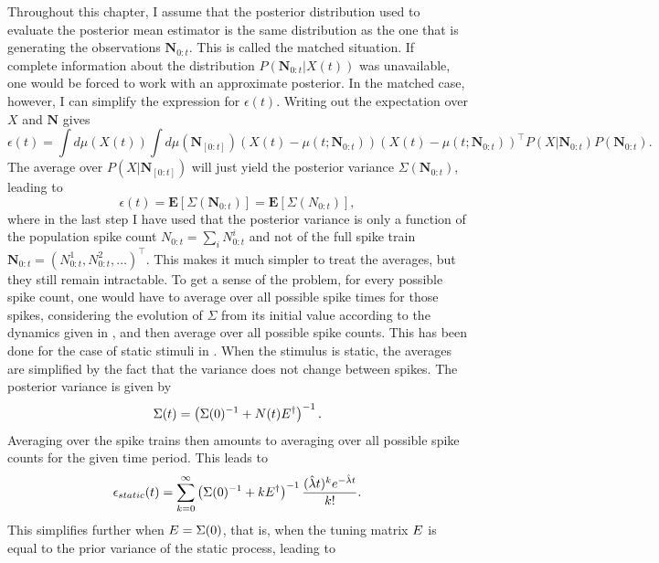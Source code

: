 Throughout this chapter, I assume that the posterior distribution used to evaluate the posterior mean estimator is the same distribution as the one that is generating the observations
$\boldsymbol{N}_{0:t}$. This is called the matched situation. If complete information about the distribution $P(\boldsymbol{N}_{0:t}|X(t))$ was unavailable, one would be forced to work
with an approximate posterior. In the matched case, however, I can simplify the expression for $\epsilon(t)$. Writing out the expectation over $X$ and $\boldsymbol{N}$ gives
\[
\epsilon(t) = \int d\mu\left(X(t)\right) \int d\mu(\boldsymbol{N}_{[0:t]}) \left(X(t) - \mu(t;\boldsymbol{N}_{0:t})\right)\left(X(t) - \mu(t;\boldsymbol{N}_{0:t})\right)^\top P(X| \boldsymbol{N}_{0:t}) P(\boldsymbol{N}_{0:t}).
\]
The average over $P(X|\boldsymbol{N}_{[0:t]})$ will just yield the posterior variance $\Sigma(\boldsymbol{N}_{0:t})$, leading to
\begin{equation}
\label{eq:eps_sigma}
\epsilon(t) = \boldsymbol{E}\left[\Sigma(\boldsymbol{N}_{0:t})\right] = \boldsymbol{E}\left[\Sigma(N_{0:t})\right],
\end{equation}
where in the last step I have used that the posterior variance is only a function of the population spike count $N_{0:t} = \sum_i N^i_{0:t}$ and not of the full spike train $\boldsymbol{N}_{0:t} = \left(N^1_{0:t}, N^2_{0:t}, \ldots\right)^\top$. This makes it much simpler to treat the averages, but they still remain intractable. To get a sense of the problem, for every possible spike count, one would have to average over all possible spike times for those spikes, considering the evolution of $\Sigma$ from its initial value according to the dynamics given in , and then average over all possible spike counts. This has been done for the case of static stimuli in . When the stimulus is static, the averages are simplified by the fact that the variance does not change between spikes. The posterior variance is given by
\[
\Sigma(t) = \left(\Sigma(0)^{-1} + N(t) E^\dagger\right)^{-1}.
\]
Averaging over the spike trains then amounts to averaging over all possible spike counts for the given time period. This leads to
\begin{equation}
\epsilon_{static}(t) = \sum_{k=0}^\infty  \left(\Sigma(0)^{-1} + k E^\dagger\right)^{-1} \frac{ (\hat{\lambda}t)^k e^{-\hat{\lambda} t }}{k!}.
\end{equation}
This simplifies further when $E = \Sigma(0)$, that is, when the tuning matrix $E$ is equal to the prior variance of the static process, leading to
